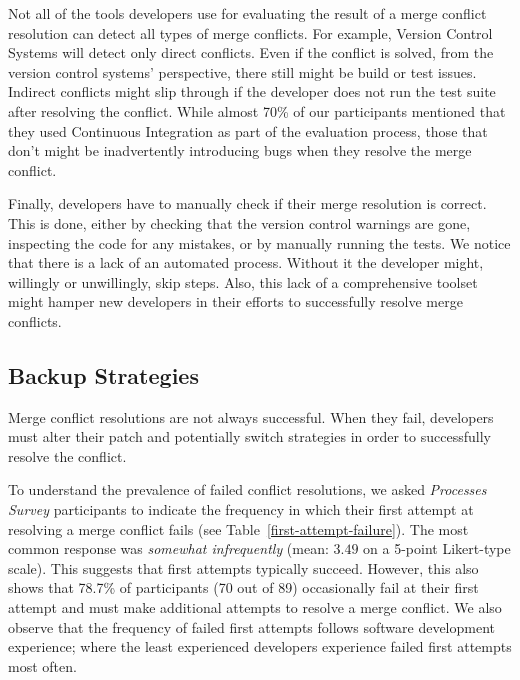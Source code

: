 Not all of the tools developers use for evaluating the result of a merge conflict resolution can detect all types of merge conflicts.
For example, Version Control Systems will detect only direct conflicts.
Even if the conflict is solved, from the version control systems' perspective, there still might be build or test issues.
Indirect conflicts might slip through if the developer does not run the test suite after resolving the conflict.
While almost 70\% of our participants mentioned that they used Continuous Integration as part of the evaluation process, those that don't might be inadvertently introducing bugs when they resolve the merge conflict.

Finally, developers have to manually check if their merge resolution is correct.
This is done, either by checking that the version control warnings are gone, inspecting the code for any mistakes, or by manually running the tests.
We notice that there is a lack of an automated process.
Without it the developer might, willingly or unwillingly, skip steps.
Also, this lack of a comprehensive toolset might hamper new developers in their efforts to successfully resolve merge conflicts.

\subsection{Backup Strategies}

Merge conflict resolutions are not always successful.
When they fail, developers must alter their patch and potentially switch strategies in order to successfully resolve the conflict.

To understand the prevalence of failed conflict resolutions, we asked \textit{Processes Survey} participants to indicate the frequency in which their first attempt at resolving a merge conflict fails (see Table~\ref{first-attempt-failure}).
The most common response was \textit{somewhat infrequently} (mean: $3.49$ on a 5-point Likert-type scale).
This suggests that first attempts typically succeed.
However, this also shows that 78.7\% of participants (70 out of 89) occasionally fail at their first attempt and must make additional attempts to resolve a merge conflict.
We also observe that the frequency of failed first attempts follows software development experience; where the least experienced developers experience failed first attempts most often.

